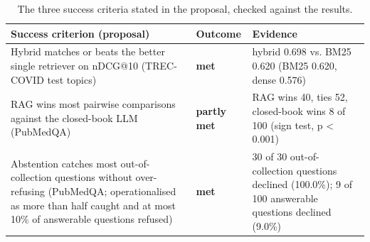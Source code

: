 \begin{table}[t]
\centering\small
\begin{tabular}{p{}p{}p{}}
\toprule
Success criterion (proposal) & Outcome & Evidence \\
\midrule
Hybrid matches or beats the better single retriever on nDCG@10 (TREC-COVID test topics) & \textbf{met} & hybrid 0.698 vs. BM25 0.620 (BM25 0.620, dense 0.576) \\
RAG wins most pairwise comparisons against the closed-book LLM (PubMedQA) & \textbf{partly met} & RAG wins 40, ties 52, closed-book wins 8 of 100 (sign test, p < 0.001) \\
Abstention catches most out-of-collection questions without over-refusing (PubMedQA; operationalised as more than half caught and at most 10\% of answerable questions refused) & \textbf{met} & 30 of 30 out-of-collection questions declined (100.0\%); 9 of 100 answerable questions declined (9.0\%) \\
\bottomrule
\end{tabular}
\caption{The three success criteria stated in the proposal, checked against the results.}
\label{tab:criteria}
\end{table}
